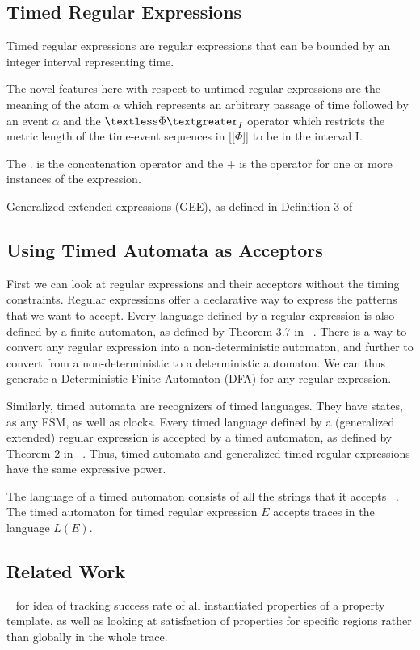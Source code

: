 \documentclass[]{sigplanconf}
\begin{document}
\subsection{Timed Regular Expressions}

Timed regular expressions are regular expressions that can be bounded by an integer interval representing time.

The novel features here with respect to untimed regular expressions are the meaning of the atom $\underline{\alpha}$ which represents an arbitrary passage of time followed by an event $\alpha$ and the $\textless \Phi \textgreater _I$ operator which restricts the metric length of the time-event sequences in [[$\Phi$]] to be in the interval I.

The $.$ is the concatenation operator and the $+$ is the operator for one or more instances of the expression.

Generalized extended expressions (GEE), as defined in Definition 3 of ~\cite{timedregex}

\subsection{Using Timed Automata as Acceptors}

First we can look at regular expressions and their acceptors without the timing constraints. Regular expressions offer a declarative way to express the patterns that we want to accept. Every language defined by a regular expression is also defined by a finite automaton, as defined by Theorem 3.7 in ~\cite{book1}. There is a way to convert any regular expression into a non-deterministic automaton, and further to convert from a non-deterministic to a deterministic automaton. We can thus generate a Deterministic Finite Automaton (DFA) for any regular expression.

Similarly, timed automata are recognizers of timed languages. They have states, as any FSM, as well as clocks. Every timed language defined by a (generalized extended) regular expression is accepted by a timed automaton, as defined by Theorem 2 in ~\cite{timedregex}. Thus, timed automata and generalized timed regular expressions have the same expressive power.

The language of a timed automaton consists of all the strings that it accepts ~\cite{timedregex}. The timed automaton for timed regular expression $E$ accepts traces in the language $L(E)$.

\subsection{Related Work}
~\cite{evans1} for idea of tracking success rate of all instantiated properties of a property template, as well as looking at satisfaction of properties for specific regions rather than globally in the whole trace.
\end{document}

